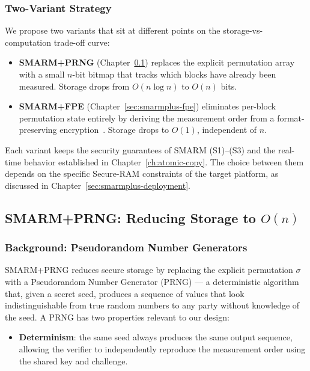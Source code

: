 \documentclass[a4paper,10pt]{article}
\begin{document}
{\subsubsection{Two-Variant Strategy}

We propose two variants that sit at different points on the 
storage-vs-computation trade-off curve:

\begin{itemize}
    \item \textbf{SMARM+PRNG} 
    (Chapter~\ref{sec:smarmplus-prng}) replaces the explicit 
    permutation array with a small $n$-bit bitmap that tracks 
    which blocks have already been measured. Storage drops from 
    $O(n \log n)$ to $O(n)$ bits.
    
    \item \textbf{SMARM+FPE} 
    (Chapter~\ref{sec:smarmplus-fpe}) eliminates per-block 
    permutation state entirely by deriving the measurement order 
    from a format-preserving 
    encryption~\cite{bellare2009fpe,dworkin2016sp800}. Storage 
    drops to $O(1)$, independent of $n$.
\end{itemize}

Each variant keeps the security guarantees of SMARM (S1)--(S3) 
and the real-time behavior established in Chapter~\ref{ch:atomic-copy}. 
The choice between them depends on the specific Secure-RAM 
constraints of the target platform, as discussed in 
Chapter~\ref{sec:smarmplus-deployment}.

\subsection{SMARM+PRNG: Reducing Storage to $O(n)$}
\label{sec:smarmplus-prng}

\subsubsection{Background: Pseudorandom Number Generators}

SMARM+PRNG reduces secure storage by replacing 
the explicit permutation $\sigma$ with a Pseudorandom Number 
Generator (PRNG) — a deterministic algorithm that, given a 
secret seed, produces a sequence of values that look 
indistinguishable from true random numbers to any party without 
knowledge of the seed. A PRNG has two properties relevant to 
our design:

\begin{itemize}
    \item \textbf{Determinism}: the same seed always produces 
    the same output sequence, allowing the verifier to 
    independently reproduce the measurement order using the 
    shared key and challenge.
    

\end{itemize}}
\end{document}
